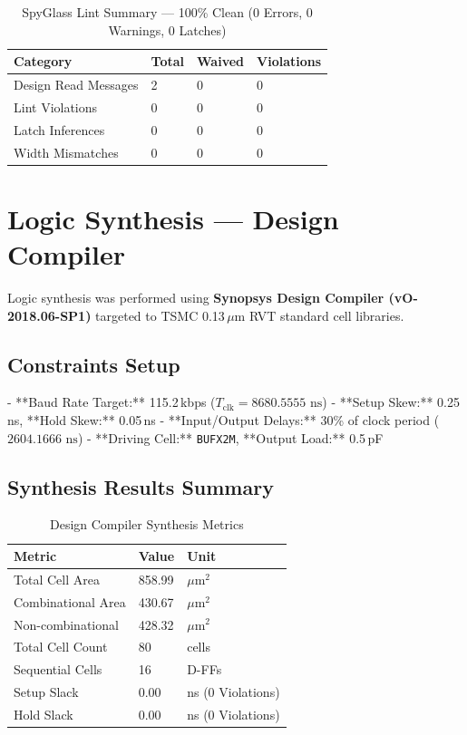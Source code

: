 \documentclass[12pt,a4paper]{article}
\begin{document}
\begin{table}[H]
\centering
\begin{tabular}{llll}
\toprule
\textbf{Category} & \textbf{Total} & \textbf{Waived} & \textbf{Violations} \\
\midrule
Design Read Messages & 2 & 0 & 0 \\
Lint Violations      & 0 & 0 & 0 \\
Latch Inferences     & 0 & 0 & 0 \\
Width Mismatches     & 0 & 0 & 0 \\
\bottomrule
\end{tabular}
\caption{SpyGlass Lint Summary — 100\% Clean (0 Errors, 0 Warnings, 0 Latches)}
\end{table}

\section{Logic Synthesis — Design Compiler}

Logic synthesis was performed using \textbf{Synopsys Design Compiler (vO-2018.06-SP1)} targeted to TSMC 0.13\,$\mu$m RVT standard cell libraries.

\subsection{Constraints Setup}
- **Baud Rate Target:** 115.2\,kbps ($T_{\text{clk}} = 8680.5555\text{ ns}$)
- **Setup Skew:** 0.25\,ns, **Hold Skew:** 0.05\,ns
- **Input/Output Delays:** 30\% of clock period ($2604.1666\text{ ns}$)
- **Driving Cell:** \texttt{BUFX2M}, **Output Load:** 0.5\,pF

\subsection{Synthesis Results Summary}

\begin{table}[H]
\centering
\begin{tabular}{lll}
\toprule
\textbf{Metric} & \textbf{Value} & \textbf{Unit} \\
\midrule
Total Cell Area      & 858.99 & $\mu$m$^2$ \\
Combinational Area   & 430.67 & $\mu$m$^2$ \\
Non-combinational    & 428.32 & $\mu$m$^2$ \\
Total Cell Count     & 80     & cells \\
Sequential Cells     & 16     & D-FFs \\
Setup Slack          & 0.00   & ns (0 Violations) \\
Hold Slack           & 0.00   & ns (0 Violations) \\
\bottomrule
\end{tabular}
\caption{Design Compiler Synthesis Metrics}
\end{table}
\end{document}
